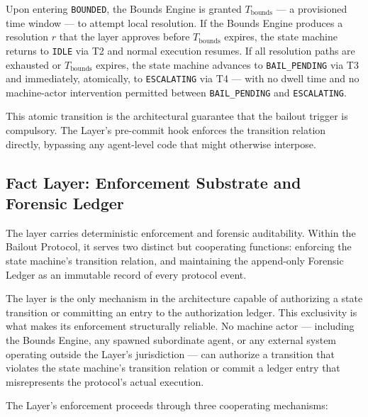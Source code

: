 Upon entering \texttt{BOUNDED}, the Bounds Engine is granted $T_{\text{bounds}}$ — a provisioned time window — to attempt local resolution. If the Bounds Engine produces a resolution $r$ that the \fact{} layer approves before $T_{\text{bounds}}$ expires, the state machine returns to \texttt{IDLE} via T2 and normal execution resumes. If all resolution paths are exhausted or $T_{\text{bounds}}$ expires, the state machine advances to \texttt{BAIL\_PENDING} via T3 and immediately, atomically, to \texttt{ESCALATING} via T4 — with no dwell time and no machine-actor intervention permitted between \texttt{BAIL\_PENDING} and \texttt{ESCALATING}.

This atomic transition is the architectural guarantee that the bailout trigger is compulsory. The \fact{} Layer's pre-commit hook enforces the transition relation directly, bypassing any agent-level code that might otherwise interpose.

\subsection{Fact Layer: Enforcement Substrate and Forensic Ledger}
\label{sec:fact-layer}

The \fact{} layer carries deterministic enforcement and forensic auditability. Within the Bailout Protocol, it serves two distinct but cooperating functions: enforcing the state machine's transition relation, and maintaining the append-only Forensic Ledger as an immutable record of every protocol event.

The \fact{} layer is the only mechanism in the \bxthree{} architecture capable of authorizing a state transition or committing an entry to the authorization ledger. This exclusivity is what makes its enforcement structurally reliable. No machine actor — including the Bounds Engine, any spawned subordinate agent, or any external system operating outside the \fact{} Layer's jurisdiction — can authorize a transition that violates the state machine's transition relation or commit a ledger entry that misrepresents the protocol's actual execution.

The \fact{} Layer's enforcement proceeds through three cooperating mechanisms:

